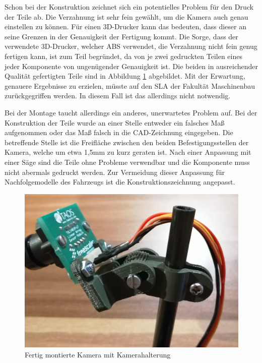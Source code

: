 Schon bei der Konstruktion zeichnet sich ein potentielles Problem für den Druck der Teile ab. Die Verzahnung ist sehr fein gewählt, um die Kamera auch genau einstellen zu können. Für einen 3D-Drucker kann das bedeuten, dass dieser an seine Grenzen in der Genauigkeit der Fertigung kommt. Die Sorge, dass der verwendete 3D-Drucker, welcher \ac{ABS} verwendet, die Verzahnung nicht fein genug fertigen kann, ist zum Teil begründet, da von je zwei gedruckten Teilen eines jeder Komponente von ungenügender Genauigkeit ist. Die beiden in ausreichender Qualität gefertigten Teile sind in Abbildung \ref{fig:KameraHalterungMontage} abgebildet. Mit der Erwartung, genauere Ergebnisse zu erzielen, müsste auf den \ac{SLA} der Fakultät Maschinenbau zurückgegriffen werden. In diesem Fall ist das allerdings nicht notwendig.\vspace{11pt}

Bei der Montage taucht allerdings ein anderes, unerwartetes Problem auf. Bei der Konstruktion der Teile wurde an einer Stelle entweder ein falsches Maß aufgenommen oder das Maß falsch in die CAD-Zeichnung eingegeben. Die betreffende Stelle ist die Freifläche zwischen den beiden Befestigungsstellen der Kamera, welche um etwa 1,5mm zu kurz geraten ist. Nach einer Anpassung mit einer Säge sind die Teile ohne Probleme verwendbar und die Komponente muss nicht abermals gedruckt werden. Zur Vermeidung dieser Anpassung für Nachfolgemodelle des Fahrzeugs ist die Konstruktionszeichnung angepasst.

\begin{figure}[H] %
\includegraphics[width=.8\textwidth]{sec2/images/3DAnbaukomponenten/Montagebilder/KameraHalterungMontage} 
\centering
\captionsetup{width=.9\textwidth}
\caption[Fertig montierte Kamera mit Kamerahalterung]{Fertig montierte Kamera mit Kamerahalterung}
\centering
\label{fig:KameraHalterungMontage}
\end{figure}

\newpage

